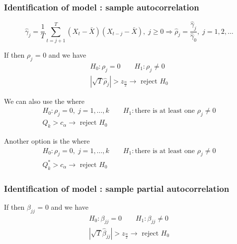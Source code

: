 \subsubsection{Identification of model : sample autocorrelation}
\begin{equation*}
    \hat{\gamma}_j = \frac{1}{T}\sum_{t=j+1}^{T}(X_t - \bar{X})(X_{t-j}-\bar{X}),\; j\geq 0
    \Rightarrow \hat{\rho}_j = \frac{\hat{\gamma}_j}{\hat{\gamma}_0},\; j= 1,2,\ldots
\end{equation*}

If  then $\rho_j$ = 0 and we have 
\begin{gather*}
    H_0: \rho_j = 0 \qquad H_1: \rho_j \neq 0\\
    \left|\sqrt{T}\hat{\rho}_j\right|>z_{\frac{\alpha}{2}} \to \text{ reject } H_0
\end{gather*}

We can also use the  where 
\begin{gather*}
    H_0: \rho_j = 0,\; j=1,\ldots,k \qquad H_1: \text{there is at least one }\rho_j \neq 0\\
    Q_k > c_{\alpha} \to \text{ reject } H_0
\end{gather*}

Another option is the  where 
\begin{gather*}
    H_0: \rho_j = 0,\; j=1,\ldots,k \qquad H_1: \text{there is at least one }\rho_j \neq 0\\
    Q^*_k > c_{\alpha} \to \text{ reject } H_0
\end{gather*} 

\subsubsection{Identification of model : sample partial autocorrelation}

If  then $\beta_{jj}$ = 0 and we have 
\begin{gather*}
    H_0: \beta_{jj} = 0 \qquad H_1: \beta_{jj} \neq 0\\
    \left|\sqrt{T}\hat{\beta}_{jj}\right|>z_{\frac{\alpha}{2}} \to \text{ reject } H_0
\end{gather*}

